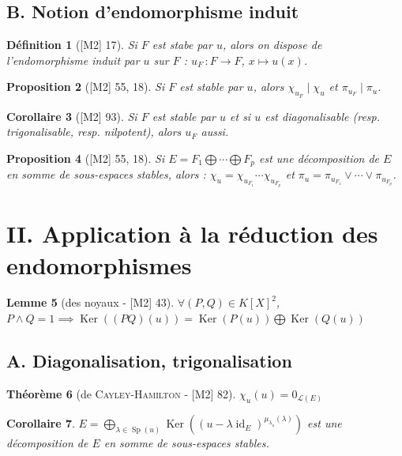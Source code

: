 \documentclass[10pt, a4paper, parskip=full, twoside, twocolumn]{report}
\newtheorem{definition}{Définition}
\newtheorem{theorem}[definition]{Théorème}
\newtheorem{proposition}[definition]{Proposition}
\newtheorem{lemma}[definition]{Lemme}
\newtheorem{corollary}[definition]{Corollaire}
\DeclareMathOperator{\Ker}{Ker}
\DeclareMathOperator{\id}{id}
\DeclareMathOperator{\Sp}{Sp}
\begin{document}
\subsection*{B. Notion d'endomorphisme induit}
\begin{definition}[\textnormal{[M2] 17}]
	Si $F$ est stabe par $u$, alors on dispose de \emph{l'endomorphisme induit par $u$ sur $F$} :
	$u_F\,\colon F\to F$, $x\mapsto u(x)$.
\end{definition}

\begin{proposition}[\textnormal{[M2] 55, 18}]
	Si $F$ est stable par $u$, alors $\chi_{u_F} \mid \chi_u$ et $\pi_{u_F}\mid \pi_u$.
\end{proposition}

\begin{corollary}[\textnormal{[M2] 93}]
	Si $F$ est stable par $u$ et si $u$ est diagonalisable (resp. trigonalisable, resp. nilpotent), alors $u_F$ aussi.
\end{corollary}

\begin{proposition}[\textnormal{[M2] 55, 18}]
	Si $E=F_1\bigoplus \cdots \bigoplus F_p$ est une décomposition de $E$ en somme de sous-espaces stables, alors :
	$\chi_u = \chi_{u_{F_1}}\cdots \chi_{u_{F_p}}$ et $\pi_u = \pi_{u_{F_1}}\vee \cdots \vee \pi_{u_{F_p}}$.
\end{proposition}

\section*{II. Application à la réduction des endomorphismes}

\begin{lemma}[des noyaux - \textnormal{[M2] 43}]
	$\forall (P,Q)\in K[X]^2$, $P\wedge Q = 1 \implies \Ker((PQ)(u)) = \Ker(P(u))\bigoplus \Ker(Q(u))$
\end{lemma}

\subsection*{A. Diagonalisation, trigonalisation}
\begin{theorem}[de \textsc{Cayley-Hamilton} - \textnormal{[M2] 82}]
	$\chi_u(u) = 0_{\mathcal{L}(E)}$
\end{theorem}

\begin{corollary}
	$E = \bigoplus_{\lambda\in \Sp(u)} \Ker\left(\left(u-\lambda \id_E\right)^{\mu_{\lambda_u}(\lambda)}\right)$
	est une décomposition de $E$ en somme de sous-espaces stables.
\end{corollary}
\end{document}
